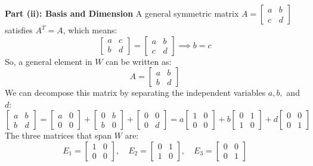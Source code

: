 \documentclass[11pt,a4paper]{article}
\begin{document}
\begin{solutionbox}
\textbf{Part (ii): Basis and Dimension}
A general symmetric matrix $A = \begin{bmatrix} a & b \\ c & d \end{bmatrix}$ satisfies $A^T = A$, which means:
\[ \begin{bmatrix} a & c \\ b & d \end{bmatrix} = \begin{bmatrix} a & b \\ c & d \end{bmatrix} \implies b = c \]
So, a general element in $W$ can be written as:
\[ A = \begin{bmatrix} a & b \\ b & d \end{bmatrix} \]
We can decompose this matrix by separating the independent variables $a, b,$ and $d$:
\[ \begin{bmatrix} a & b \\ b & d \end{bmatrix} = \begin{bmatrix} a & 0 \\ 0 & 0 \end{bmatrix} + \begin{bmatrix} 0 & b \\ b & 0 \end{bmatrix} + \begin{bmatrix} 0 & 0 \\ 0 & d \end{bmatrix} = a \begin{bmatrix} 1 & 0 \\ 0 & 0 \end{bmatrix} + b \begin{bmatrix} 0 & 1 \\ 1 & 0 \end{bmatrix} + d \begin{bmatrix} 0 & 0 \\ 0 & 1 \end{bmatrix} \]
The three matrices that span $W$ are:
\[ E_1 = \begin{bmatrix} 1 & 0 \\ 0 & 0 \end{bmatrix}, \quad E_2 = \begin{bmatrix} 0 & 1 \\ 1 & 0 \end{bmatrix}, \quad E_3 = \begin{bmatrix} 0 & 0 \\ 0 & 1 \end{bmatrix} \]

\end{solutionbox}
\end{document}
